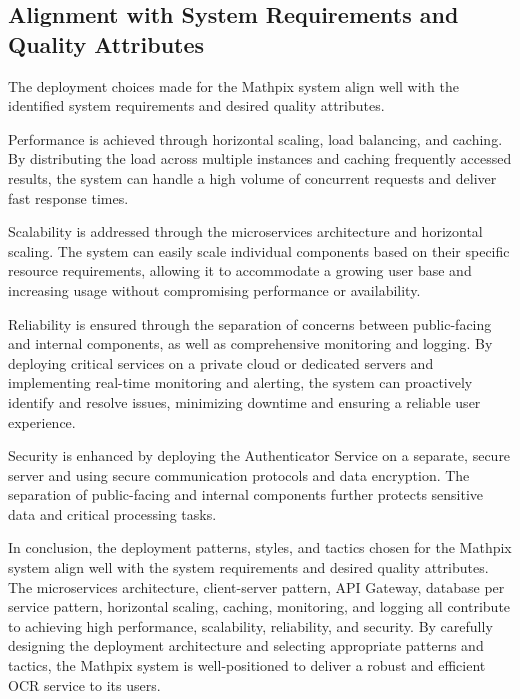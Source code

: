 \documentclass{article}
\begin{document}
\subsection{Alignment with System Requirements and Quality Attributes}
The deployment choices made for the Mathpix system align well with the identified system requirements and desired quality attributes.

Performance is achieved through horizontal scaling, load balancing, and caching. By distributing the load across multiple instances and caching frequently accessed results, the system can handle a high volume of concurrent requests and deliver fast response times.

Scalability is addressed through the microservices architecture and horizontal scaling. The system can easily scale individual components based on their specific resource requirements, allowing it to accommodate a growing user base and increasing usage without compromising performance or availability.

Reliability is ensured through the separation of concerns between public-facing and internal components, as well as comprehensive monitoring and logging. By deploying critical services on a private cloud or dedicated servers and implementing real-time monitoring and alerting, the system can proactively identify and resolve issues, minimizing downtime and ensuring a reliable user experience.

Security is enhanced by deploying the Authenticator Service on a separate, secure server and using secure communication protocols and data encryption. The separation of public-facing and internal components further protects sensitive data and critical processing tasks.

In conclusion, the deployment patterns, styles, and tactics chosen for the Mathpix system align well with the system requirements and desired quality attributes. The microservices architecture, client-server pattern, API Gateway, database per service pattern, horizontal scaling, caching, monitoring, and logging all contribute to achieving high performance, scalability, reliability, and security. By carefully designing the deployment architecture and selecting appropriate patterns and tactics, the Mathpix system is well-positioned to deliver a robust and efficient OCR service to its users.
\end{document}
